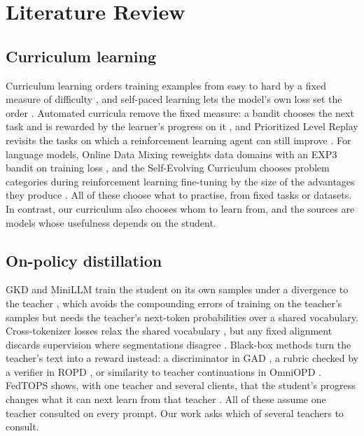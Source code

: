 \chapter{Literature Review}
\label{ca:chap:lit}

\section{Curriculum learning}

Curriculum learning orders training examples from easy to hard by a fixed measure of
difficulty \autocite{bengio_curriculum_2009}, and self-paced learning lets the model's own
loss set the order \autocite{kumar_selfpaced_2010}. Automated curricula remove the fixed
measure: a bandit chooses the next task and is rewarded by the learner's progress on it
\autocite{graves_curriculum_2017,matiisen_tscl_2017}, and Prioritized Level Replay revisits
the tasks on which a reinforcement learning agent can still improve
\autocite{jiang_plr_2021}. For language models, Online Data Mixing reweights data domains
with an EXP3 bandit on training loss \autocite{albalak_odm_2023,auer_exp3_2002}, and the
Self-Evolving Curriculum chooses problem categories during reinforcement learning
fine-tuning by the size of the advantages they produce \autocite{chen_sec_2025}. All of
these choose what to practise, from fixed tasks or datasets. In contrast, our curriculum
also chooses whom to learn from, and the sources are models whose usefulness depends on the
student.

\section{On-policy distillation}

GKD and MiniLLM train the student on its own samples under a divergence to the teacher
\autocite{agarwal_gkd_2024,gu_minillm_2024}, which avoids the compounding errors of
training on the teacher's samples \autocite{ross_dagger_2011} but needs the teacher's
next-token probabilities over a shared vocabulary. Cross-tokenizer losses relax the shared
vocabulary \autocite{boizard_uld_2025,patino_gold_2025}, but any fixed alignment discards
supervision where segmentations disagree \autocite{sun_simct_2026}. Black-box methods turn
the teacher's text into a reward instead: a discriminator in GAD \autocite{ye_gad_2025},
a rubric checked by a verifier in ROPD \autocite{fang_ropd_2026}, or similarity to teacher
continuations in OmniOPD \autocite{zhou_omniopd_2026}. FedTOPS shows, with one teacher and
several clients, that the student's progress changes what it can next learn from that
teacher \autocite{chen_fedtops_2026}. All of these assume one teacher consulted on every
prompt. Our work asks which of several teachers to consult.

